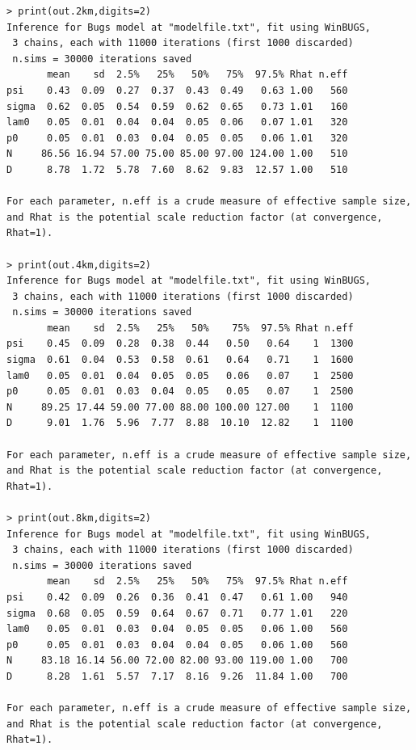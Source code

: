 {\small
\begin{verbatim}
> print(out.2km,digits=2)
Inference for Bugs model at "modelfile.txt", fit using WinBUGS,
 3 chains, each with 11000 iterations (first 1000 discarded)
 n.sims = 30000 iterations saved
       mean    sd  2.5%   25%   50%   75%  97.5% Rhat n.eff
psi    0.43  0.09  0.27  0.37  0.43  0.49   0.63 1.00   560
sigma  0.62  0.05  0.54  0.59  0.62  0.65   0.73 1.01   160
lam0   0.05  0.01  0.04  0.04  0.05  0.06   0.07 1.01   320
p0     0.05  0.01  0.03  0.04  0.05  0.05   0.06 1.01   320
N     86.56 16.94 57.00 75.00 85.00 97.00 124.00 1.00   510
D      8.78  1.72  5.78  7.60  8.62  9.83  12.57 1.00   510

For each parameter, n.eff is a crude measure of effective sample size,
and Rhat is the potential scale reduction factor (at convergence, Rhat=1).

> print(out.4km,digits=2)
Inference for Bugs model at "modelfile.txt", fit using WinBUGS,
 3 chains, each with 11000 iterations (first 1000 discarded)
 n.sims = 30000 iterations saved
       mean    sd  2.5%   25%   50%    75%  97.5% Rhat n.eff
psi    0.45  0.09  0.28  0.38  0.44   0.50   0.64    1  1300
sigma  0.61  0.04  0.53  0.58  0.61   0.64   0.71    1  1600
lam0   0.05  0.01  0.04  0.05  0.05   0.06   0.07    1  2500
p0     0.05  0.01  0.03  0.04  0.05   0.05   0.07    1  2500
N     89.25 17.44 59.00 77.00 88.00 100.00 127.00    1  1100
D      9.01  1.76  5.96  7.77  8.88  10.10  12.82    1  1100

For each parameter, n.eff is a crude measure of effective sample size,
and Rhat is the potential scale reduction factor (at convergence, Rhat=1).

> print(out.8km,digits=2)
Inference for Bugs model at "modelfile.txt", fit using WinBUGS,
 3 chains, each with 11000 iterations (first 1000 discarded)
 n.sims = 30000 iterations saved
       mean    sd  2.5%   25%   50%   75%  97.5% Rhat n.eff
psi    0.42  0.09  0.26  0.36  0.41  0.47   0.61 1.00   940
sigma  0.68  0.05  0.59  0.64  0.67  0.71   0.77 1.01   220
lam0   0.05  0.01  0.03  0.04  0.05  0.05   0.06 1.00   560
p0     0.05  0.01  0.03  0.04  0.04  0.05   0.06 1.00   560
N     83.18 16.14 56.00 72.00 82.00 93.00 119.00 1.00   700
D      8.28  1.61  5.57  7.17  8.16  9.26  11.84 1.00   700

For each parameter, n.eff is a crude measure of effective sample size,
and Rhat is the potential scale reduction factor (at convergence, Rhat=1).
\end{verbatim}
}


